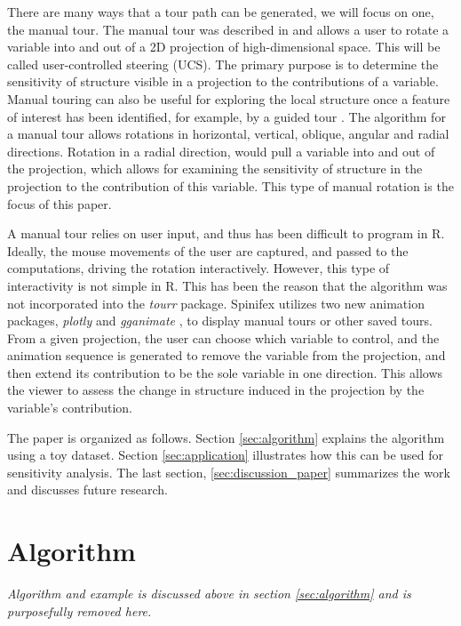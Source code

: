 \documentclass{monashthesis}
\begin{document}
There are many ways that a tour path can be generated, we will focus on
one, the manual tour. The manual tour was described in
\textcite{cook_manual_1997} and allows a user to rotate a variable into
and out of a 2D projection of high-dimensional space. This will be
called user-controlled steering (UCS). The primary purpose is to
determine the sensitivity of structure visible in a projection to the
contributions of a variable. Manual touring can also be useful for
exploring the local structure once a feature of interest has been
identified, for example, by a guided tour \autocite{cook_grand_1995}.
The algorithm for a manual tour allows rotations in horizontal,
vertical, oblique, angular and radial directions. Rotation in a radial
direction, would pull a variable into and out of the projection, which
allows for examining the sensitivity of structure in the projection to
the contribution of this variable. This type of manual rotation is the
focus of this paper.

A manual tour relies on user input, and thus has been difficult to
program in R. Ideally, the mouse movements of the user are captured, and
passed to the computations, driving the rotation interactively. However,
this type of interactivity is not simple in R. This has been the reason
that the algorithm was not incorporated into the \emph{tourr} package.
Spinifex utilizes two new animation packages, \emph{plotly}
\autocite{sievert_plotly_2018} and \emph{gganimate}
\autocite{pedersen_gganimate:_2019}, to display manual tours or other
saved tours. From a given projection, the user can choose which variable
to control, and the animation sequence is generated to remove the
variable from the projection, and then extend its contribution to be the
sole variable in one direction. This allows the viewer to assess the
change in structure induced in the projection by the variable's
contribution.

The paper is organized as follows. Section \ref{sec:algorithm} explains
the algorithm using a toy dataset. Section \ref{sec:application}
illustrates how this can be used for sensitivity analysis. The last
section, \ref{sec:discussion_paper} summarizes the work and discusses
future research.

\section{Algorithm}\label{sec:algorithm_paper}

\emph{Algorithm and example is discussed above in section
\ref{sec:algorithm} and is purposefully removed here.}
\end{document}
